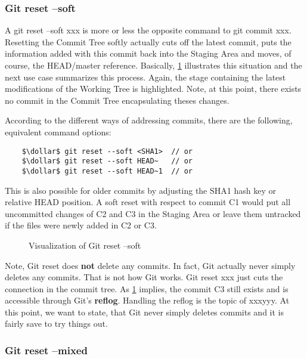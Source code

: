 \subsubsection*{Git reset --soft}

A git reset --soft xxx is more or less the opposite command to git commit xxx. Resetting the Commit Tree softly
actually cuts off the latest commit, puts the information added with this commit back into the Staging Area and moves,
of course, the HEAD/master reference. Basically, \cref{fig:GitResetSoft} illustrates this situation  and 
the next use case summarizes this process. Again, the stage containing the latest modifications of the Working Tree is 
highlighted. Note, at this point, there exists no commit in the Commit Tree encapsulating theses changes.


According to the different ways of addressing commits, there are the following, equivalent command options:
\begin{lstlisting}
	$\dollar$ git reset --soft <SHA1>  // or
	$\dollar$ git reset --soft HEAD~   // or
	$\dollar$ git reset --soft HEAD~1  // or
\end{lstlisting}
This is also possible for older commits by adjusting the SHA1 hash key or relative HEAD position. A soft reset with respect 
to commit C1 would put all uncommitted changes of C2 and C3 in the Staging Area or leave them untracked if the files were  
newly added in C2 or C3.
\begin{figure}[H]
	\centering
	
	\caption{Visualization of Git reset --soft}
	\label{fig:GitResetSoft}
\end{figure}
Note, Git reset does \textbf{not} delete any commits. In fact, Git actually never simply deletes any commits. That 
is not how Git works. Git reset xxx just cuts the connection in the commit tree. As  \cref{fig:GitResetSoft} implies, 
the commit C3 still exists and is accessible through Git's \textbf{reflog}. 
Handling the reflog is the topic of xxxyyy. At this point, we want to state, that Git never simply deletes commits and
it is fairly save to try things out.




\subsubsection*{Git reset --mixed}

